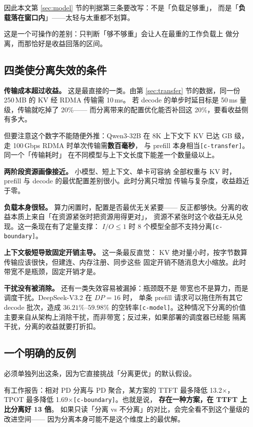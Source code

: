 因此本文第 \ref{sec:model} 节的判据第三条要改写：不是「负载足够重」，
而是「\textbf{负载落在窗口内}」——太轻与太重都不划算。

这是一个可操作的差别：只判断「够不够重」会让人在最重的工作负载上
做分离，而那恰好是收益回落的区间。

\subsection{四类使分离失效的条件}

\noindent\textbf{ 传输成本超过收益。} 这是最直接的一类。由第
\ref{sec:transfer} 节的数据，同一份 250\,MB 的 KV 经 RDMA 传输需 10\,ms。
若 decode 的单步时延目标是 50\,ms 量级，传输就吃掉了 20\%——
而分离带来的配置优化能否补回这 20\%，要看收益侧有多大。

但要注意这个数字不能随便外推：Qwen3-32B 在 8K 上下文下 KV 已达
GB 级，走 100\,Gbps RDMA 时单次传输需\textbf{数百毫秒}，
与 prefill 本身相当\texttt{[c-transfer]}。同一个「传输耗时」
在不同模型与上下文长度下能差一个数量级以上。

\noindent\textbf{ 两阶段资源画像接近。} 小模型、短上下文、单卡可容纳
全部权重与 KV 时，prefill 与 decode 的最优配置差别很小。此时分离只增加
传输与复杂度，收益趋近于零。

\noindent\textbf{ 负载本身很轻。} 算力闲置时，配置是否最优无关紧要——
反正都够快。分离的收益本质上来自「在资源紧张时把资源用得更对」，
资源不紧张时这个收益无从兑现。这一条现在有了定量支撑：
$I/O \le 1$ 时 8 个模型全部不支持分离\texttt{[c-boundary]}。

\noindent\textbf{ 上下文极短导致固定开销主导。} 这一条最反直觉：
KV 绝对量小时，按字节数算传输应该很快，但建连、内存注册、同步这些
固定开销不随消息大小缩放。此时带宽不是瓶颈，固定开销才是。

\noindent\textbf{ 干扰没有被消除。} 还有一类失效容易被漏掉：瓶颈既不是
带宽也不是算力，而是调度干扰。DeepSeek-V3.2 在 $DP=16$ 时，
单条 prefill 请求可以拖住所有其它 decode 批次，造成
$36.21\%$--$59.98\%$ 的空转率\texttt{[c-model]}。这种情况下分离的价值
主要来自从架构上消除干扰，而非带宽；反过来，如果部署的调度器已经能
隔离干扰，分离的收益就要打折扣。

\subsection{一个明确的反例}

必须单独列出这条，因为它直接挑战「分离更优」的默认假设。

有工作报告：相对 PD 分离与 PD 聚合，某方案的 TTFT 最多降低 13.2×，
TPOT 最多降低 1.69×\texttt{[c-boundary]}。也就是说，
\textbf{存在一种方案，在 TTFT 上比分离好 13 倍}。
如果只读「分离 vs 不分离」的对比，会完全看不到这个量级的改进空间——
因为分离本身可能不是这个维度上的最优解。

